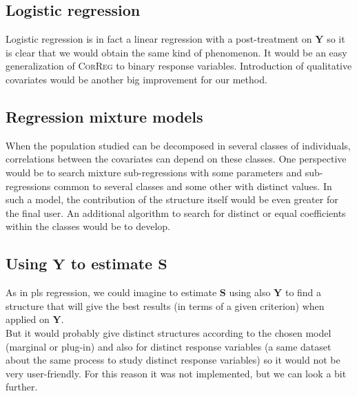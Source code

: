 \documentclass[12pt,a4paper]{report}
\begin{document}
		\subsection{Logistic regression}
			Logistic regression \cite{hosmer2000applied} is in fact a linear regression with a post-treatment on $\boldsymbol{Y}$ so it is clear that we would obtain the same kind of phenomenon. It would be an easy generalization of \textsc{CorReg} to binary response variables. Introduction of qualitative covariates would be another big improvement for our method.
			\subsection{Regression mixture models}
			When the population studied can be decomposed in several classes of individuals, correlations between the covariates can depend on these classes. One perspective would be to search mixture sub-regressions \cite{de1989mixtures} with some parameters and sub-regressions common to several classes and some other with distinct values. In such a model, the contribution of the structure itself would be even greater for the final user. An additional algorithm to search for distinct or equal coefficients within the classes would be to develop.
			\subsection{Using $\boldsymbol{Y}$ to estimate $\boldsymbol{S}$}
			As in {\sc pls} regression, we could imagine to estimate $\boldsymbol{S}$ using also $\boldsymbol{Y}$ to find a structure that will give the best results (in terms of a given criterion) when applied on $\boldsymbol{Y}$.\\
			
			 But it would probably give distinct structures according to the chosen model (marginal or plug-in) and also for distinct response variables (a same dataset about the same process to study distinct response variables) so it would not be very user-friendly. For this reason it was not implemented, but we can look a bit further.\\
			 
\end{document}
